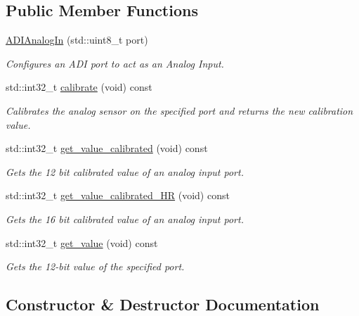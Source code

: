 \subsection*{Public Member Functions}
\begin{DoxyCompactItemize}
\item 
\mbox{\hyperlink{classpros_1_1ADIAnalogIn_aeac81958e7ba33ee9693ab843f5b55ed}{A\+D\+I\+Analog\+In}} (std\+::uint8\+\_\+t port)
\begin{DoxyCompactList}\small\item\em Configures an A\+DI port to act as an Analog Input. \end{DoxyCompactList}\item 
std\+::int32\+\_\+t \mbox{\hyperlink{classpros_1_1ADIAnalogIn_ac8dd1e625cbcec4951d20be0c0fa2d3c}{calibrate}} (void) const
\begin{DoxyCompactList}\small\item\em Calibrates the analog sensor on the specified port and returns the new calibration value. \end{DoxyCompactList}\item 
std\+::int32\+\_\+t \mbox{\hyperlink{classpros_1_1ADIAnalogIn_a5930ce87c880833bda8cd202613b8d80}{get\+\_\+value\+\_\+calibrated}} (void) const
\begin{DoxyCompactList}\small\item\em Gets the 12 bit calibrated value of an analog input port. \end{DoxyCompactList}\item 
std\+::int32\+\_\+t \mbox{\hyperlink{classpros_1_1ADIAnalogIn_a65bfed175ed1b0efce4566e78e7f9473}{get\+\_\+value\+\_\+calibrated\+\_\+\+HR}} (void) const
\begin{DoxyCompactList}\small\item\em Gets the 16 bit calibrated value of an analog input port. \end{DoxyCompactList}\item 
std\+::int32\+\_\+t \mbox{\hyperlink{classpros_1_1ADIAnalogIn_ac79b5fd3ce67ae6ffc4b1fbbb306e997}{get\+\_\+value}} (void) const
\begin{DoxyCompactList}\small\item\em Gets the 12-\/bit value of the specified port. \end{DoxyCompactList}\end{DoxyCompactItemize}


\subsection{Constructor \& Destructor Documentation}
\mbox{\label{classpros_1_1ADIAnalogIn_aeac81958e7ba33ee9693ab843f5b55ed}} 
